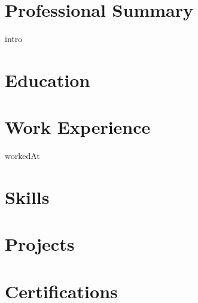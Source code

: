 \documentclass[11pt,a4paper,sans]{moderncv}
\begin{document}
\makecvtitle

\section{Professional Summary}
{intro}

\section{Education}
\vspace{-\baselineskip}

\section{Work Experience}
{\fontsize{11}{13}\selectfont workedAt}

\section{Skills}

\section{Projects}

\section{Certifications}
\end{document}
